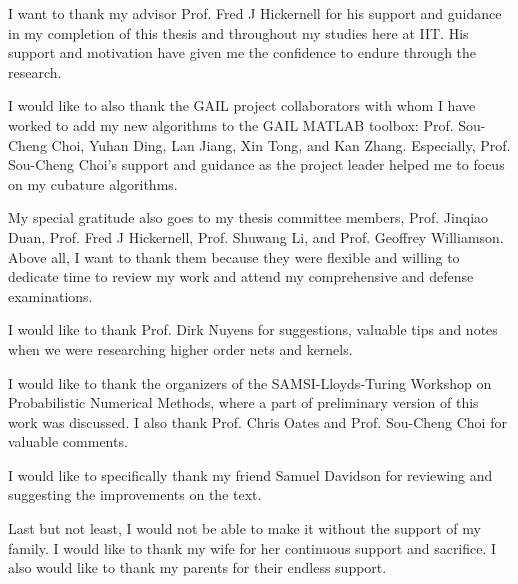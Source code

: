 \documentclass{iitthesis}          %
\begin{document}
\begin{acknowledgement}     %
	\par  I want to thank my advisor Prof. Fred J Hickernell for his support and guidance in my completion of this thesis and throughout my studies here at IIT. 
	His support and motivation have given me the confidence to endure through the research. 
	
	I would like to also thank the GAIL project collaborators with
	whom I have worked to add my new algorithms to the GAIL MATLAB toolbox: Prof. Sou-Cheng Choi,
	Yuhan Ding, Lan Jiang, Xin Tong, and Kan Zhang. Especially, Prof. Sou-Cheng Choi's support and guidance as the project leader helped me to focus on my cubature algorithms.
	
	My special gratitude also goes to my thesis committee members, Prof. Jinqiao Duan,
	Prof. Fred J Hickernell, Prof. Shuwang Li, and Prof. Geoffrey Williamson. Above all, I want to thank them because they were flexible and willing to dedicate time to review my work and attend my comprehensive and defense examinations.
	
	I would like to thank Prof. Dirk Nuyens for suggestions, valuable tips and notes when we were researching higher order nets and kernels.
	
	I would like to thank the organizers of the SAMSI-Lloyds-Turing Workshop on Probabilistic Numerical Methods, where a part of preliminary version of this work was discussed.  I also thank Prof. Chris Oates and Prof. Sou-Cheng Choi for valuable comments.
	
	I would like to specifically thank my friend Samuel Davidson for reviewing and suggesting the improvements on the text.
	
	Last but not least, I would not be able to make it without the support of my family. I would like to thank my wife for her continuous support and sacrifice. I also would like to thank my parents for their endless support.


	
\end{acknowledgement}

\tableofcontents
\end{document}
